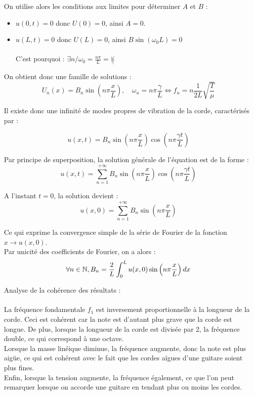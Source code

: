 \documentclass[a4,12pt]{article}
\newcommand{\N}{\mathbb{N}}
\begin{document}
On utilise alors les conditions aux limites pour déterminer $A$ et $B$ :\\
\begin{itemize}
  \item $u(0,t) = 0$  donc  $U(0) = 0$, ainsi $A = 0$.\\
  \item $u(L,t) = 0$  donc  $U(L) = 0$, ainsi $B \sin(\omega_0 L) = 0$\\\\
    C'est pourquoi :
    $\exists n / \omega_0 = \frac{n\pi}{L} = \frac{\omega}{\gamma}$\\
\end{itemize}

On obtient donc une famille de solutions :
\[
U_n(x)=B_n\sin(n\pi \frac{x}{L}),\quad \omega_n=n\pi \frac{\gamma}{L}\Leftrightarrow f_n=n\frac{1}{2L}\sqrt{\frac{T}{\mu}}
\]

Il existe donc une infinité de modes propres de vibration de la corde, caractérisés par :

\[
u(x,t)=B_n\sin\left(n\pi \frac{x}{L}\right) \cos\left(n\pi \frac{\gamma t}{L}\right)
\]

Par principe de superposition, la solution générale de l'équation est de la forme :
\[
u(x,t)=\sum_{n=1}^{+\infty}B_n\sin\left(n\pi \frac{x}{L}\right) \cos\left(n\pi \frac{\gamma t}{L}\right)
\]

A l'instant $t = 0$, la solution devient :
\[
u(x,0)=\sum_{n=1}^{+\infty}B_n\sin\left(n\pi \frac{x}{L}\right)
\]

Ce qui exprime la convergence simple de la série de Fourier de la fonction $x \rightarrow u(x,0)$.\\
Par unicité des coefficients de Fourier, on a alors :
\[ 
\forall n \in \N, B_n = {2 \over L} \int_{0}^{L} u(x,0) \sin \left(n \pi {x \over L}\right) dx
\]

Analyse de la cohérence des résultats :\\\\
La fréquence fondamentale $f_1$ est inversement proportionnelle à la longueur de la corde. Ceci est cohérent car la note est d'autant plus grave que la corde est longue. De plus, lorsque la longueur de la corde est divisée par 2, la fréquence double, ce qui correspond à une octave.\\
Lorsque la masse linéique diminue, la fréquence augmente, donc la note est plus aigüe, ce qui est cohérent avec le fait que les cordes aïgues d'une guitare soient plus fines.\\
Enfin, lorsque la tension augmente, la fréquence également, ce que l'on peut remarquer lorsque on accorde une guitare en tendant plus ou moins les cordes.\\
\end{document}
